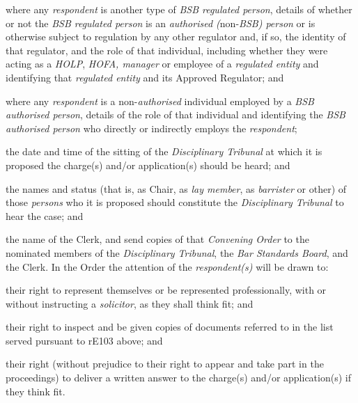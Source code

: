 \item where any \emph{respondent} is another type of \emph{BSB regulated
person}, details of whether or not the \emph{BSB regulated person} is
an \emph{authorised (}non-\emph{BSB) person} or is otherwise subject to
regulation by any other regulator and, if so, the identity of that
regulator, and the role of that individual, including whether they were
acting as a \emph{HOLP}, \emph{HOFA, manager} or employee of
a \emph{regulated entity} and identifying that \emph{regulated
entity }and its Approved Regulator; and
\item where any \emph{respondent} is a non-\emph{authorised }individual
employed by a \emph{BSB authorised person}, details of the role of  that
individual and identifying the \emph{BSB authorised person} who directly
or indirectly employs the \emph{respondent};
\rl  \setcounter{enumi}{1}

\item  the date and time of the sitting of the \emph{Disciplinary
Tribunal} at which it is proposed the charge(s) and/or application(s)
should be heard; and\\
\item  the names and status (that is, as Chair, as \emph{lay member},
as \emph{barrister} or other) of those \emph{persons} who it is proposed
should constitute the \emph{Disciplinary Tribunal} to hear the case;
and\\
\item  the name of the Clerk,\lr\ln
and send copies of that \emph{Convening Order} to the nominated members
of the \emph{Disciplinary Tribunal}, the\emph{ Bar Standards Board}, and
the Clerk. In the Order the attention of the \emph{respondent(s)} will
be drawn to:
\nl
\item their right to represent themselves or be represented
professionally, with or without instructing a \emph{solicitor}, as they
shall think fit; and
\item their right to inspect and be given copies of documents referred to
in the list served pursuant to rE103 above; and
\item their right (without prejudice to their right to appear and take
part in the proceedings) to deliver a written answer to the charge(s)
and/or application(s) if they think fit.\ln\lr\la

